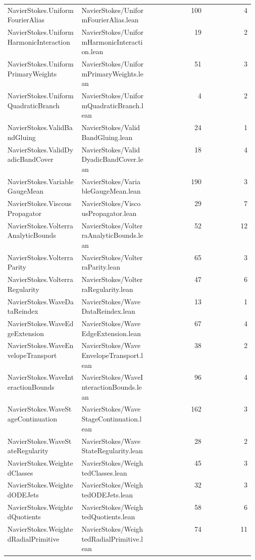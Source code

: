 \begin{longtable}{p{0.30\linewidth}p{0.28\linewidth}rr}
NavierStokes.UniformFourierAlias & NavierStokes/UniformFourierAlias.lean & 100 & 4\\
NavierStokes.UniformHarmonicInteraction & NavierStokes/UniformHarmonicInteraction.lean & 19 & 2\\
NavierStokes.UniformPrimaryWeights & NavierStokes/UniformPrimaryWeights.lean & 51 & 3\\
NavierStokes.UniformQuadraticBranch & NavierStokes/UniformQuadraticBranch.lean & 4 & 2\\
NavierStokes.ValidBandGluing & NavierStokes/ValidBandGluing.lean & 24 & 1\\
NavierStokes.ValidDyadicBandCover & NavierStokes/ValidDyadicBandCover.lean & 18 & 4\\
NavierStokes.VariableGaugeMean & NavierStokes/VariableGaugeMean.lean & 190 & 3\\
NavierStokes.ViscousPropagator & NavierStokes/ViscousPropagator.lean & 29 & 7\\
NavierStokes.VolterraAnalyticBounds & NavierStokes/VolterraAnalyticBounds.lean & 52 & 12\\
NavierStokes.VolterraParity & NavierStokes/VolterraParity.lean & 65 & 3\\
NavierStokes.VolterraRegularity & NavierStokes/VolterraRegularity.lean & 47 & 6\\
NavierStokes.WaveDataReindex & NavierStokes/WaveDataReindex.lean & 13 & 1\\
NavierStokes.WaveEdgeExtension & NavierStokes/WaveEdgeExtension.lean & 67 & 4\\
NavierStokes.WaveEnvelopeTransport & NavierStokes/WaveEnvelopeTransport.lean & 38 & 2\\
NavierStokes.WaveInteractionBounds & NavierStokes/WaveInteractionBounds.lean & 96 & 4\\
NavierStokes.WaveStageContinuation & NavierStokes/WaveStageContinuation.lean & 162 & 3\\
NavierStokes.WaveStateRegularity & NavierStokes/WaveStateRegularity.lean & 28 & 2\\
NavierStokes.WeightedClasses & NavierStokes/WeightedClasses.lean & 45 & 3\\
NavierStokes.WeightedODEJets & NavierStokes/WeightedODEJets.lean & 32 & 3\\
NavierStokes.WeightedQuotients & NavierStokes/WeightedQuotients.lean & 58 & 6\\
NavierStokes.WeightedRadialPrimitive & NavierStokes/WeightedRadialPrimitive.lean & 74 & 11\\

\end{longtable}
